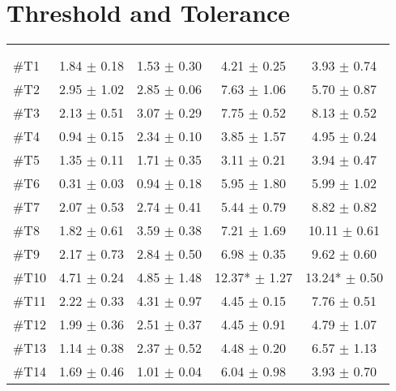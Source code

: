 \section{Threshold and Tolerance} \label{sec:ThresTolA}
\begin{longtable} {l|c|c|c|c}
 \rowcolor[HTML]{C0C0C0} 
  \color[HTML]{000000}{} & 
 \multicolumn{2}{c|}{ \color[HTML]{000000}{\textbf{Threshold}}} & \multicolumn{2}{c}{ \color[HTML]{000000}{\textbf{Tolerance}}}  	\\  \rule{0pt}{3ex} 
  \cellcolor[HTML]{C0C0C0}{} &
 \multicolumn{1}{c|}{ \cellcolor[HTML]{C0C0C0}{Pre [KgF]}} & \multicolumn{1}{c|}{ \cellcolor[HTML]{C0C0C0}{Post [KgF]}} 
 & \multicolumn{1}{|c|}{ \cellcolor[HTML]{C0C0C0}{Pre [KgF]}} 
 & \multicolumn{1}{c|}{ \cellcolor[HTML]{C0C0C0}{Post [KgF]}} 	\\ \hline 
\#T1 & 1.84 $\pm$ 0.18 & 1.53 $\pm$ 0.30 & 4.21 $\pm$ 0.25 & 3.93 $\pm$ 0.74 \\ \hline
\#T2 & 2.95 $\pm$ 1.02 & 2.85 $\pm$ 0.06 & 7.63 $\pm$ 1.06  & 5.70 $\pm$ 0.87 \\ \hline
\#T3 & 2.13 $\pm$ 0.51 & 3.07 $\pm$ 0.29 & 7.75 $\pm$ 0.52 & 8.13 $\pm$ 0.52 \\ \hline
\#T4 & 0.94 $\pm$ 0.15 & 2.34 $\pm$ 0.10 & 3.85 $\pm$ 1.57 & 4.95 $\pm$ 0.24 \\ \hline
\#T5 & 1.35 $\pm$ 0.11 & 1.71 $\pm$ 0.35 & 3.11 $\pm$ 0.21  & 3.94 $\pm$ 0.47 \\ \hline	
\#T6 & 0.31 $\pm$ 0.03 & 0.94 $\pm$ 0.18 & 5.95 $\pm$ 1.80 & 5.99 $\pm$  1.02\\ \hline
\#T7 & 2.07 $\pm$ 0.53  & 2.74 $\pm$ 0.41 & 5.44 $\pm$ 0.79 & 8.82 $\pm$ 0.82  \\ \hline
\#T8 & 1.82 $\pm$ 0.61 & 3.59 $\pm$ 0.38 & 7.21 $\pm$ 1.69 & 10.11 $\pm$ 0.61 \\ \hline
\#T9 & 2.17 $\pm$ 0.73 & 2.84 $\pm$ 0.50 & 6.98 $\pm$  0.35 & 9.62 $\pm$ 0.60 \\ \hline
\#T10 & 4.71 $\pm$ 0.24 & 4.85 $\pm$ 1.48  & 12.37*  $\pm$ 1.27  & 13.24* $\pm$ 0.50  \\ \hline
\#T11 & 2.22 $\pm$ 0.33 & 4.31 $\pm$ 0.97 & 4.45 $\pm$ 0.15 & 7.76 $\pm$  0.51 \\ \hline
\#T12 & 1.99 $\pm$ 0.36 & 2.51 $\pm$ 0.37  & 4.45 $\pm$ 0.91  & 4.79 $\pm$ 1.07  \\ \hline
\#T13 & 1.14 $\pm$ 0.38 & 2.37 $\pm$ 0.52 & 4.48 $\pm$ 0.20 & 6.57 $\pm$ 1.13 \\ \hline
\#T14 & 1.69 $\pm$ 0.46 & 1.01 $\pm$ 0.04 & 6.04 $\pm$ 0.98 & 3.93 $\pm$ 0.70 \\ \hline

\end{longtable}
